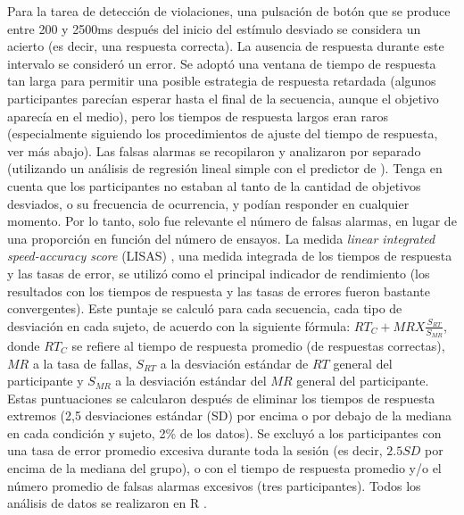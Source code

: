 Para la tarea de detección de violaciones, una pulsación de botón que se produce entre 200 y 2500ms después del inicio del estímulo desviado se considera un acierto (es decir, una respuesta correcta). La ausencia de respuesta durante este intervalo se consideró un error. Se adoptó una ventana de tiempo de respuesta tan larga para permitir una posible estrategia de respuesta retardada (algunos participantes parecían esperar hasta el final de la secuencia, aunque el objetivo aparecía en el medio), pero los tiempos de respuesta largos eran raros (especialmente siguiendo los procedimientos de ajuste del tiempo de respuesta, ver más abajo). Las falsas alarmas se recopilaron y analizaron por separado (utilizando un análisis de regresión lineal simple con el predictor de \mdlbin). Tenga en cuenta que los participantes no estaban al tanto de la cantidad de objetivos desviados, o su frecuencia de ocurrencia, y podían responder en cualquier momento. Por lo tanto, solo fue relevante el número de falsas alarmas, en lugar de una proporción en función del número de ensayos. La medida \textit{linear integrated speed-accuracy score} (LISAS) \cite{f87,f88}, una medida integrada de los tiempos de respuesta y las tasas de error, se utilizó como el principal indicador de rendimiento (los resultados con los tiempos de respuesta y las tasas de errores fueron bastante convergentes). Este puntaje se calculó para cada secuencia, cada tipo de desviación en cada sujeto, de acuerdo con la siguiente fórmula: $RT_C + MR X \frac{S_{RT}}{S_{MR}}$, donde $RT_C$ se refiere al tiempo de respuesta promedio (de respuestas correctas), $MR$ a la tasa de fallas, $S_{RT}$ a la desviación estándar de $RT$ general del participante y $S_{MR}$ a la desviación estándar del $MR$ general del participante. Estas puntuaciones se calcularon después de eliminar los tiempos de respuesta extremos (2,5 desviaciones estándar (SD) por encima o por debajo de la mediana en cada condición y sujeto, 2\% de los datos). Se excluyó a los participantes con una tasa de error promedio excesiva durante toda la sesión (es decir, $2.5 SD$ por encima de la mediana del grupo), o con el tiempo de respuesta promedio y/o el número promedio de falsas alarmas excesivos (tres participantes). Todos los análisis de datos se realizaron en R \cite{f136}.


